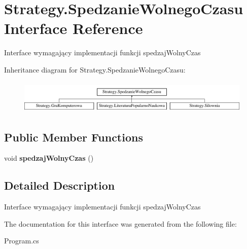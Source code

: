 \hypertarget{interface_strategy_1_1_spedzanie_wolnego_czasu}{}\section{Strategy.\+Spedzanie\+Wolnego\+Czasu Interface Reference}
\label{interface_strategy_1_1_spedzanie_wolnego_czasu}


Interface wymagający implementacji funkcji spedzaj\+Wolny\+Czas  


Inheritance diagram for Strategy.\+Spedzanie\+Wolnego\+Czasu\+:\begin{figure}[H]
\begin{center}
\leavevmode
\includegraphics[height=1.588652cm]{interface_strategy_1_1_spedzanie_wolnego_czasu}
\end{center}
\end{figure}
\subsection*{Public Member Functions}
\begin{DoxyCompactItemize}
\item 
\mbox{\label{interface_strategy_1_1_spedzanie_wolnego_czasu_a6b3d9e8040830b0a624da862dfe1d9c2}} 
void {\bfseries spedzaj\+Wolny\+Czas} ()
\end{DoxyCompactItemize}


\subsection{Detailed Description}
Interface wymagający implementacji funkcji spedzaj\+Wolny\+Czas 



The documentation for this interface was generated from the following file\+:\begin{DoxyCompactItemize}
\item 
Program.\+cs\end{DoxyCompactItemize}
